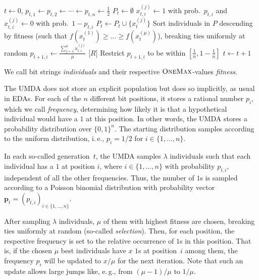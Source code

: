 \documentclass[11pt, a4paper]{article}
\newcommand*{\om}{\textsc{OneMax}\xspace}
\newcommand{\umdastar}{UMDA$^*$\xspace}
\newcommand{\umda}{UMDA\xspace}
\newcommand{\ie}{i.\,e.\xspace}
\newcommand{\eg}{e.\,g.\xspace}
\begin{document}
\begin{algorithm2e}
    $t \gets 0$, 
    $p_{t,1} \gets p_{t,2} \gets \cdots \gets p_{t,n} \gets \tfrac{1}{2}$\;
    {
        $P_t \gets \emptyset$\;
        {
            {
                $x^{(j)}_{t, i} \gets 1$ with prob.\ $p_{t,i}$ and $x^{(j)}_{t,i} \gets 0$ with prob.\ $1 - p_{t,i}$\;
            }
            $P_t \gets P_t \cup \{x^{(j)}_t\}$\;
        }
        Sort individuals in $P$ descending by fitness (such that $f(x^{(1)}_t) \ge \dots\ge f(x^{(\mu)}_t)$), breaking ties uniformly at random\;
        {
            $p_{t + 1,i} \gets \frac{\sum_{j = 1}^{\mu} x^{(j)}_{t,i}}{\mu}$\;
            $\bigl[R\bigr]$ Restrict $p_{t+1,i}$ to be within $[\tfrac{1}{n}, 1 - \tfrac{1}{n}]$\;
        }
        $t \gets t+1$\;
    }
    \caption{Univariate Marginal Distribution Algorithm (\umda); algorithm \umdastar is obtained if the line indexed $\bigl[R\bigr]$ is omitted.}
    \label{alg:UMDA}
\end{algorithm2e}

We call bit strings \emph{individuals} and their respective $\om$-values \emph{fitness}.

The \umda does not store an explicit population but does so implicitly, as usual in 
EDAs. For each of the $n$ different bit positions, 
it stores a rational number $p_i$, which we call \emph{frequency}, determining how likely it is 
that a hypothetical individual would have a $1$ at this position. In other words, the \umda stores 
a probability distribution over $\{0, 1\}^n$. The starting distribution samples according to 
the uniform distribution, \ie, 
 $p_i=1/2$ for $i\in\{1,\dots,n\}$. 

In each so-called generation~$t$, the \umda samples $\lambda$ individuals such that each individual has a $1$ 
at position $i$, where $i \in \{1, \dots, n\}$ with probability $p_{t,i}$, independent of all the other 
frequencies. Thus, the number of $1$s is sampled according to a Poisson binomial distribution with probability 
vector $\bm{p}_{t}=(p_{t,i})_{i \in \{1, \dots, n\}}$.

After sampling $\lambda$ individuals, $\mu$ of them with highest fitness are chosen, 
breaking ties uniformly at random (so-called \emph{selection}). Then, for each position, 
the respective frequency is set to the relative occurrence of $1$s in this position. That is, 
if the chosen $\mu$ best individuals have $x$ $1$s at position~$i$ among them, the frequency $p_i$ will be 
updated to $x/\mu$ for the next iteration. Note that such an update allows large 
jumps like, \eg, from $(\mu - 1)/\mu$ to $1/\mu$.
\end{document}
